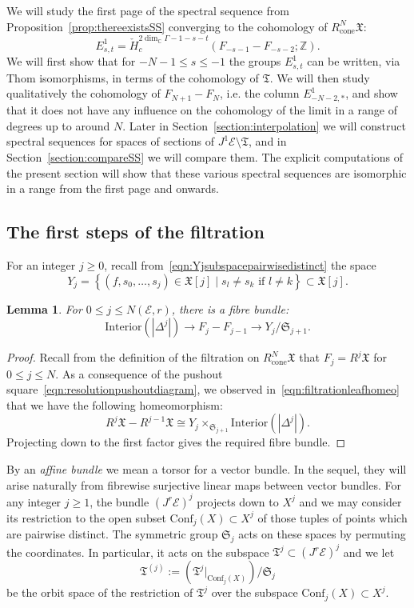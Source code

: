 \documentclass[a4paper]{amsart}
\newcommand{\bZ}{\mathbb Z}
\newcommand{\bC}{\mathbb C}
\newcommand{\cE}{\mathcal E}
\newcommand{\fX}{\mathfrak X}
\newcommand{\fT}{\mathfrak T}
\newcommand{\lra}{\longrightarrow}
\newcommand{\fS}{\mathfrak S}
\theoremstyle{plain}
\newtheorem{lemma}[theorem]{Lemma}
\theoremstyle{definition}
\newcommand{\CCH}{\check{H}_{c}}
\newcommand{\Conf}{\mathrm{Conf}}
\begin{document}
We will study the first page of the spectral sequence from Proposition~\ref{prop:thereexistsSS} converging to the cohomology of $R^N_{\text{cone}}\fX$:
\[
    E^1_{s,t} = \CCH^{2\dim_\bC \Gamma - 1 - s - t}(F_{-s-1} - F_{-s-2}; \bZ).
\]
We will first show that for $-N-1 \leq s \leq -1$ the groups $E^1_{s,t}$ can be written, via Thom isomorphisms, in terms of the cohomology of $\fT$. We will then study qualitatively the cohomology of $F_{N+1} - F_{N}$, i.e. the column $E^1_{-N-2,*}$, and show that it does not have any influence on the cohomology of the limit in a range of degrees up to around $N$. Later in Section~\ref{section:interpolation} we will construct spectral sequences for spaces of sections of $J^1\cE \setminus \fT$, and in Section~\ref{section:compareSS} we will compare them. The explicit computations of the present section will show that these various spectral sequences are isomorphic in a range from the first page and onwards.

\subsection{The first steps of the filtration}

For an integer $j \geq 0$, recall from~\eqref{eqn:Yjsubspacepairwisedistinct} the space 
\[
    Y_j = \left\{ (f,s_0, \ldots, s_j) \in \fX[j] \mid s_l \neq s_k \text{ if } l \neq k \right\} \subset \fX[j].
\]
\begin{lemma}\label{lemma:firstbundle}
For $0 \leq j \leq N(\cE,r)$, there is a fibre bundle:
\[
    \mathrm{Interior}\left(|\Delta^j|\right) \lra F_j - F_{j-1} \lra Y_j / \fS_{j+1}.
\]
\end{lemma}
\begin{proof}
Recall from the definition of the filtration on $R^N_{\text{cone}}\fX$ that $F_j = R^j\fX$ for $0 \leq j \leq N$. As a consequence of the pushout square~\eqref{eqn:resolutionpushoutdiagram}, we observed in~\eqref{eqn:filtrationleafhomeo} that we have the following homeomorphism:
\[
    R^j\fX - R^{j-1}\fX \cong Y_j \times_{\fS_{j+1}} \mathrm{Interior}(|\Delta^j|).
\]
Projecting down to the first factor gives the required fibre bundle.
\end{proof}

By an \emph{affine bundle} we mean a torsor for a vector bundle. In the sequel, they will arise naturally from fibrewise surjective linear maps between vector bundles. For any integer $j \geq 1$, the bundle $(J^r\cE)^j$ projects down to $X^j$ and we may consider its restriction to the open subset $\Conf_j(X) \subset X^j$ of those tuples of points which are pairwise distinct. The symmetric group $\fS_j$ acts on these spaces by permuting the coordinates. In particular, it acts on the subspace $\fT^j \subset (J^r\cE)^j$ and we let
\begin{equation}\label{eqn:TaylorconditionaboveConfdivided}
    \fT^{(j)} := \left( \fT^j|_{\Conf_j(X)} \right) / \fS_j
\end{equation}
be the orbit space of the restriction of $\fT^j$ over the subspace $\Conf_j(X) \subset X^j$.
\end{document}
